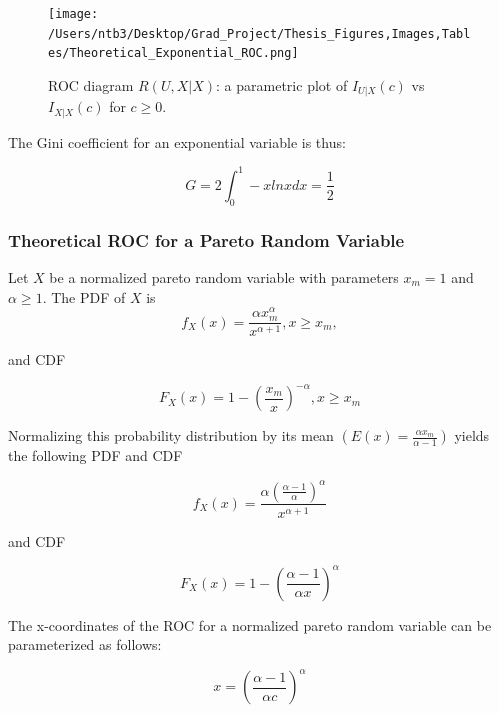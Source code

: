 \documentclass[12pt]{article} %
\theoremstyle{plain}
\begin{document}
  
\begin{figure} [!htbp]
	\centering
	\texttt{[image:  /Users/ntb3/Desktop/Grad\_Project/Thesis\_Figures,Images,Tables/Theoretical\_Exponential\_ROC.png]}
	\caption{ROC diagram $R(U,X|X)$: a parametric plot of $I_{U|X}(c)$ vs $I_{X|X}(c)$ for $c \geq 0$. 
	}
	\label{fig:mass_of_level_sets}
\end{figure}

The Gini coefficient for an exponential variable is thus:

\begin{equation}
	G = 2\int_0^1 -xlnx dx = \frac{1}{2}
\end{equation}

\pagebreak

\clearpage

\subsubsection{Theoretical ROC for a Pareto Random Variable}

Let $X$ be a normalized pareto random variable with parameters $x_m =1$ and $\alpha \geq 1 $. The PDF of $X$ is 
\begin{equation}
	f_X(x) = 	\frac{\alpha x_m^{\alpha}}{x^{\alpha+1}}  , x \geq x_m, 
\end{equation}   

\noindent and CDF 

\begin{equation}
	F_X(x) = 	1- \left({\frac{x_m}{x}}\right)^{-\alpha} , x \geq x_m 
\end{equation}  

Normalizing this probability distribution by its mean $(E(x)=\frac{\alpha x_m}{\alpha-1})$ yields the following PDF and CDF

\begin{equation}
	f_X(x) = 	\frac{\alpha (\frac{\alpha - 1}{\alpha})^{\alpha}}{x^{\alpha+1}} 
\end{equation}   

\noindent and CDF 

\begin{equation}
F_X(x) = 1- \left({\frac{\alpha -1}{\alpha x}}\right)^{\alpha}
\end{equation}  


The x-coordinates of the ROC for a normalized pareto random variable can be parameterized as follows:

\begin{equation} \label{eq:xcoord_pareto}
	x= \left(\frac{\alpha -1}{\alpha c}\right)^{\alpha}
\end{equation}
\end{document}
